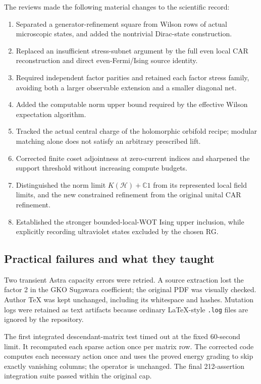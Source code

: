 The reviews made the following material changes to the scientific record:
\begin{enumerate}
\item Separated a generator-refinement square from Wilson rows of actual
microscopic states, and added the nontrivial Dirac-state construction.
\item Replaced an insufficient stress-subnet argument by the full even local
CAR reconstruction and direct even-Fermi/Ising source identity.
\item Required independent factor parities and retained each factor stress
family, avoiding both a larger observable extension and a smaller diagonal net.
\item Added the computable norm upper bound required by the effective
Wilson expectation algorithm.
\item Tracked the actual central charge of the holomorphic orbifold recipe;
modular matching alone does not satisfy an arbitrary prescribed lift.
\item Corrected finite coset adjointness at zero-current indices and sharpened
the support threshold without increasing compute budgets.
\item Distinguished the norm limit $K(\mathcal H)+\mathbb C1$ from its
represented local field limits, and the new constrained refinement from the
original unital CAR refinement.
\item Established the stronger bounded-local-WOT Ising upper inclusion,
while explicitly recording ultraviolet states excluded by the chosen RG.
\end{enumerate}

\subsection{Practical failures and what they taught}

Two transient Astra capacity errors were retried. A source extraction lost
the factor 2 in the GKO Sugawara coefficient; the original PDF was visually
checked. Author TeX was kept unchanged, including its whitespace and hashes.
Mutation logs were retained as text artifacts because ordinary LaTeX-style
\texttt{.log} files are ignored by the repository.

The first integrated descendant-matrix test timed out at the fixed 60-second
limit. It recomputed each sparse action once per matrix row. The corrected
code computes each necessary action once and uses the proved energy grading
to skip exactly vanishing columns; the operator is unchanged. The final
212-assertion integration suite passed within the original cap.

